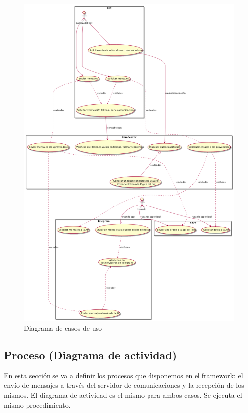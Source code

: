 \documentclass[spanish,12pt, a4paper, twoside]{paper}
\begin{document}
\begin{figure}
\centering
	\includegraphics[width=\textwidth]{recursos/usecases}
\caption{Diagrama de casos de uso}
\label{fig:Diagrama de casos de uso}
\end{figure}

\subsection{Proceso (Diagrama de actividad)}

En esta sección se va a definir los procesos que disponemos en el framework: el envío de mensajes a través del servidor de comunicaciones y la recepción de los mismos. El diagrama de actividad es el mismo para ambos casos. Se ejecuta el mismo procedimiento.
\end{document}
